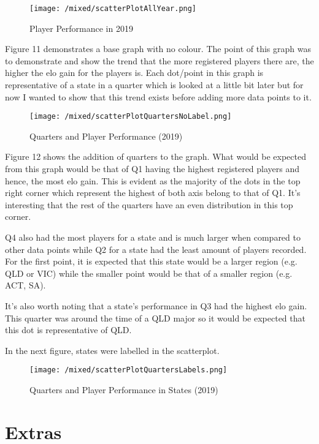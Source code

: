 \documentclass[11pt, oneside, a4paper]{article}
\begin{document}
\begin{figure}[!ht]
	\centerline{\texttt{[image: /mixed/scatterPlotAllYear.png]}}
	\caption{Player Performance in 2019}
	\label{fig:figure11}
\end{figure}
Figure 11 demonstrates a base graph with no colour. The point of this graph was to demonstrate and show the trend that the more registered players there are, the higher the elo gain for the players is. Each dot/point in this graph is representative of a state in a quarter which is looked at a little bit later but for now I wanted to show that this trend exists before adding more data points to it.

\newpage
\begin{figure}[!ht]
	\centerline{\texttt{[image: /mixed/scatterPlotQuartersNoLabel.png]}}
	\caption{Quarters and Player Performance (2019)}
	\label{fig:figure12}
\end{figure}

Figure 12 shows the addition of quarters to the graph. What would be expected from this graph would be that of Q1 having the highest registered players and hence, the most elo gain. This is evident as the majority of the dots in the top right corner which represent the highest of both axis belong to that of Q1. It's interesting that the rest of the quarters have an even distribution in this top corner. 

Q4 also had the most players for a state and is much larger when compared to other data points while Q2 for a state had the least amount of players recorded. For the first point, it is expected that this state would be a larger region (e.g. QLD or VIC) while the smaller point would be that of a smaller region (e.g. ACT, SA).

It's also worth noting that a state's performance in Q3 had the highest elo gain. This quarter was around the time of a QLD major so it would be expected that this dot is representative of QLD. 

In the next figure, states were labelled in the scatterplot.

\newpage
\begin{figure}[!ht]
	\centerline{\texttt{[image: /mixed/scatterPlotQuartersLabels.png]}}
	\caption{Quarters and Player Performance in States (2019)}
	\label{fig:figure13}
\end{figure}

\newpage
\section{Extras}
\end{document}
